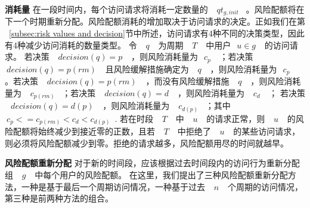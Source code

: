 \textbf{消耗量} 在一段时间内，每个访问请求将消耗一定数量的 ~$~qt_{g,init}$~ 。风险配额将在下一个时期重新分配。风险配额消耗的增加取决于访问请求的决定。正如我们在第 ~\ref{subsec:risk values and decision}节中所述，访问请求有4种不同的决策类型，因此有4种减少访问消耗的数量类型。 令 ~$~q~$~ 为周期 ~$~T~$~ 中用户~$~u \in g~$~ 的访问请求。 若决策 ~$~decision(q)=p~$~ ，则风险消耗量为~$~c_p~$~ ；若决策 ~$~decision(q)=p(rm)~$~ 且风险缓解措施确定为 ~$~q~$~ ，则风险消耗量为~$~c_p~$~ 。若决策 ~$~decision(q)=p(rm)~$~ ，而没有风险缓解措施 ~$~q~$~ ，则风险消耗量为 ~$~c_{p(rm)}$~ ；若决策 ~$~decision(q)=d~$~ ，则风险消耗量为 ~$~c_d~$~ ； 若决策 ~$~decision(q)=d(p)~$~ ，则风险消耗量为 ~$~c_{d(p)}$~ ；其中 ~$~c_p <= c_{p(rm)} < c_d < c_{d(p)}$~. 若在时段 ~$~T~$~ 中 ~$~u~$~ 的请求正常，则 ~$~u~$~ 的风险配额将始终减少到接近零的正数，且若 ~$~T~$~ 中拒绝了 ~$~u~$~ 的某些访问请求，则必须将风险配额减少到零。拒绝的请求越多，风险配额用尽的时间就越早。

\textbf{风险配额重新分配} 对于新的时间段，应该根据过去时间段内的访问行为重新分配组 ~$~g~$~ 中每个用户的风险配额。 在这里，我们提出了三种风险配额重新分配方法，一种是基于最后一个周期访问情况，一种基于过去 ~$~n~$~ 个周期的访问情况，第三种是前两种方法的组合。

